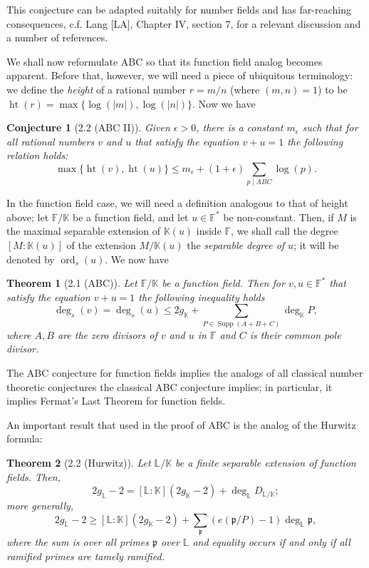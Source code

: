 \documentclass[11pt]{article}
\theoremstyle{scplain}
\newtheorem*{conjecture}{Conjecture}
\newtheorem*{theorem}{Theorem}
\DeclareMathOperator{\Supp}{Supp}
\begin{document}
\setlength{\emergencystretch}{2em}

This conjecture can be adapted suitably for number fields and has far-reaching
consequences, c.f. Lang [LA], Chapter IV, section 7, for a relevant discussion
and a number of references.

We shall now reformulate ABC so that its function field analog becomes apparent.
Before that, however, we will need a piece of ubiquitous terminology: we define
the \emph{height} of a rational number $r=m/n$ (where $(m,n)=1$) to be
$\operatorname{ht}(r)=\max\{\log(|m|),\log(|n|)\}$. Now we have

\begin{conjecture}[2.2 (ABC II)]
Given $\epsilon>0$, there is a constant $m_\epsilon$ such that for all rational
numbers $v$ and $u$ that satisfy the equation $v+u=1$ the following relation
holds:
\[
  \max\{\operatorname{ht}(v),\operatorname{ht}(u)\}
    \leq m_\epsilon+(1+\epsilon)\sum_{p\mid ABC}\log(p).
\]
\end{conjecture}

In the function field case, we will need a definition analogous to that of
height above; let $\mathbb{F}/\mathbb{K}$ be a function field, and let
$u \in \mathbb{F}^*$ be non-constant. Then, if $M$ is the maximal separable
extension of $\mathbb{K}(u)$ inside $\mathbb{F}$, we shall call the degree
$[M:\mathbb{K}(u)]$ of the extension $M/\mathbb{K}(u)$ the \emph{separable
degree of $u$}; it will be denoted by $\operatorname{ord}_s(u)$. We now have

\begin{theorem}[2.1 (ABC)]
Let $\mathbb{F}/\mathbb{K}$ be a function field. Then for
$v,u \in \mathbb{F}^*$ that satisfy the equation $v+u=1$ the following
inequality holds
\[
  \deg_s(v)=\deg_s(u) \leq 2g_{\mathbb{K}}
    + \sum_{P \in \Supp(A+B+C)}\deg_{\mathbb{K}}P,
\]
where $A,B$ are the zero divisors of $v$ and $u$ in $\mathbb{F}$ and $C$ is
their common pole divisor.
\end{theorem}

The ABC conjecture for function fields implies the analogs of all classical
number theoretic conjectures the classical ABC conjecture implies; in
particular, it implies Fermat's Last Theorem for function fields.

An important result that used in the proof of ABC is the analog of the Hurwitz
formula:

\begin{theorem}[2.2 (Hurwitz)]
Let $\mathbb{L}/\mathbb{K}$ be a finite separable extension of function fields.
Then,
\[
  2g_{\mathbb{L}}-2
    = [\mathbb{L}:\mathbb{K}](2g_{\mathbb{K}}-2)
      + \deg_{\mathbb{L}}D_{\mathbb{L}/\mathbb{K}};
\]
more generally,
\[
  2g_{\mathbb{L}}-2
    \geq [\mathbb{L}:\mathbb{K}](2g_{\mathbb{K}}-2)
      + \sum_{\mathfrak{p}}(e(\mathfrak{p}/P)-1)\deg_{\mathbb{L}}\mathfrak{p},
\]
where the sum is over all primes $\mathfrak{p}$ over $\mathbb{L}$ and equality
occurs if and only if all ramified primes are tamely ramified.
\end{theorem}
\end{document}
